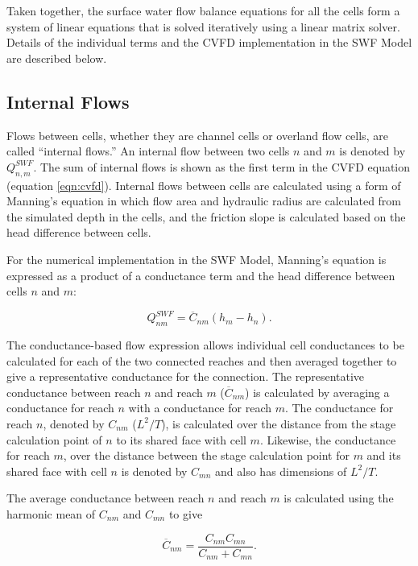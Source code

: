 \documentclass[fleqn]{article}
\begin{document}
Taken together, the surface water flow balance equations for all the cells form a system of linear equations that is solved iteratively using a linear matrix solver. Details of the individual terms and the CVFD implementation in the SWF Model are described below.

\subsection{Internal Flows}
Flows between cells, whether they are channel cells or overland flow cells, are called ``internal flows.'' An internal flow between two cells $n$ and $m$ is denoted by $Q_{n,m}^{SWF}$.  The sum of internal flows is shown as the first term in the CVFD equation (equation \ref{eqn:cvfd}).  Internal flows between cells are calculated using a form of Manning's equation in which flow area and hydraulic radius are calculated from the simulated depth in the cells, and the friction slope is calculated based on the head difference between cells.  

For the numerical implementation in the SWF Model, Manning's equation is expressed as a product of a conductance term and the head difference between cells $n$ and $m$:

\begin{equation}
  Q_{nm}^{SWF} = \overline{C}_{nm} \left ( h_m - h_n \right ).
\end{equation}

\noindent The conductance-based flow expression allows individual cell conductances to be calculated for each of the two connected reaches and then averaged together to give a representative conductance for the connection.  The representative conductance between reach $n$ and reach $m$ ($\overline{C}_{nm}$) is calculated by averaging a conductance for reach $n$ with a conductance for reach $m$.  The conductance for reach $n$, denoted by $C_{nm}$ ($L^2/T$), is calculated over the distance from the stage calculation point of $n$ to its shared face with cell $m$.  Likewise, the conductance for reach $m$, over the distance between the stage calculation point for $m$ and its shared face with cell $n$ is denoted by $C_{mn}$ and also has dimensions of $L^2/T$.

The average conductance between reach $n$ and reach $m$ is calculated using the harmonic mean of $C_{nm}$ and $C_{mn}$ to give

\begin{equation}
  \overline{C}_{nm} = \frac{C_{nm}  C_{mn}}{C_{nm} + C_{mn}}.
\end{equation}
\end{document}
